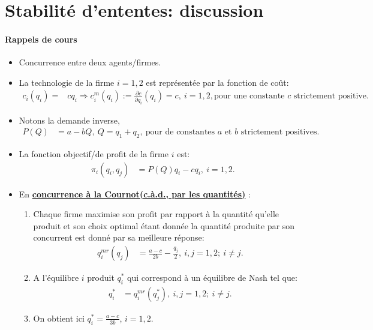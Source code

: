 \section{Stabilité d'ententes: discussion}
\frame {\sectionpage}

\begin{frame}[allowframebreaks]{\insertsection}
\framesubtitle{Rappels de cours}
\begin{itemize}
    \item Concurrence entre deux agents/firmes.
    \item La technologie de la firme $i = 1, 2$ est représentée par la fonction de coût:
    \begin{align*}
        c_i(q_i) =& c q_i \Rightarrow  c^m_i(q_i) :=\frac{\partial c}{\partial q_i}(q_i) = c,  \ i = 1, 2, \text{pour une constante $c$ strictement positive}.\  
    \end{align*}
    \item Notons la demande inverse,
    \begin{align*}
        P(Q) &= a - b Q, \ Q = q_1+q_2, \ \text{pour de constantes $a$ et $b$ strictement positives}.
    \end{align*}
    \item La fonction objectif/de profit de la firme $i$ est:
    \begin{align*}
        \pi_i(q_i, q_j) &=P(Q)q_i - c q_i, \ i=1, 2.
    \end{align*}
    \framebreak 
    \item En \textbf{\underline{concurrence à la Cournot(c.à.d., par les quantités)}} :
    \begin{enumerate}[-]
        \item Chaque firme maximise son profit par rapport à la quantité qu'elle produit et son choix optimal étant donnée 
        la quantité produite par son concurrent est donné par sa meilleure réponse:
        \begin{align*}
            q_i^{mr}(q_j) &=\frac{a-c}{2b} - \frac{q_j}{2}, \ i, j = 1, 2; \ i\neq j.
        \end{align*}
        \item A l'équilibre $i$ produit $q_i^*$ qui correspond à un équilibre  de Nash tel que:
        \begin{align*}
            q_i^* &=q_i^{mr}(q_j^*), \  i, j = 1, 2; \ i\neq j.
        \end{align*}
        \item On obtient ici $q_i^* = \frac{a-c}{3b}$, $i = 1, 2$.

\end{enumerate}
\end{itemize}
\end{frame}
